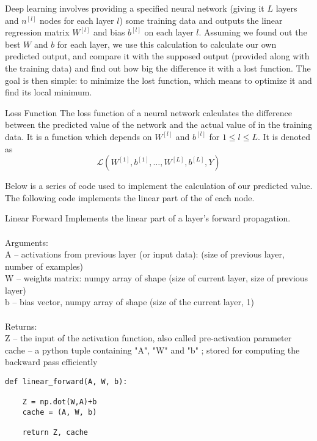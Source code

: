 \documentclass[a4paper]{article}
\begin{document}
Deep learning involves providing a specified neural network (giving it $L$ layers and $n^{[l]}$ nodes for each layer $l$) some training data and outputs the linear regression matrix $W^{[l]}$ and bias $b^{[l]}$ on each layer $l$. Assuming we found out the best $W$ and $b$ for each layer, we use this calculation to calculate our own predicted output, and compare it with the supposed output (provided along with the training data) and find out how big the difference it with a lost function. The goal is then simple: to minimize the lost function, which means to optimize it and find its local minimum. 

\begin{defn}{Loss Function}{} The loss function of a neural network calculates the difference between the predicted value of the network and the actual value of in the training data. It is a function which depends on $W^{[l]}$ and $b^{[l]}$ for $1\leq l\leq L$. It is denoted as $$\mathcal{L}(W^{[1]},b^{[1]},\dots,W^{[L]},b^{[L]},Y)$$
\end{defn}

Below is a series of code used to implement the calculation of our predicted value. 
The following code implements the linear part of the of each node. 

\begin{alg}{Linear Forward}{} Implements the linear part of a layer's forward propagation.\\~\\
Arguments:\\
A -- activations from previous layer (or input data): (size of previous layer, number of examples)\\
W -- weights matrix: numpy array of shape (size of current layer, size of previous layer)\\
b -- bias vector, numpy array of shape (size of the current layer, 1)\\~\\
Returns:\\
Z -- the input of the activation function, also called pre-activation parameter\\
cache -- a python tuple containing "A", "W" and "b" ; stored for computing the backward pass efficiently\\
\begin{verbatim}
def linear_forward(A, W, b):

    Z = np.dot(W,A)+b
    cache = (A, W, b)
    
    return Z, cache
\end{verbatim}
\end{alg}
\end{document}
